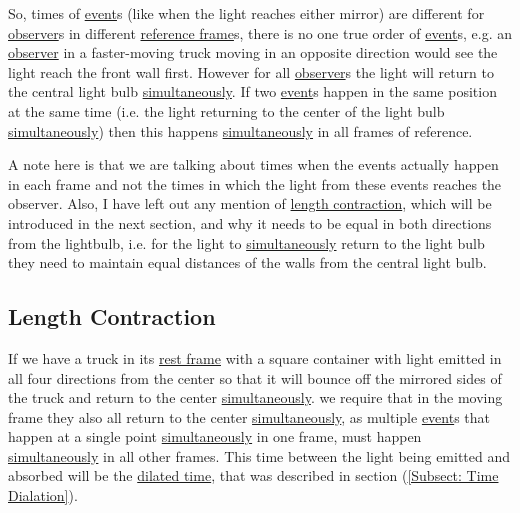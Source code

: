 So, times of \hyperlink{def-event}{event}s (like when the light reaches either mirror) are different for \hyperlink{def-observer}{observer}s in different \hyperlink{def-Reference-frame}{reference frame}s, there is no one true order of \hyperlink{def-event}{event}s, e.g. an \hyperlink{def-observer}{observer} in a faster-moving truck moving in an opposite direction would see the light reach the front wall first.
However for all \hyperlink{def-observer}{observer}s the light will return to the central light bulb \hyperlink{def-simultaneity}{simultaneously}. If two \hyperlink{def-event}{event}s happen in the same position at the same time (i.e. the light returning to the center of the light bulb \hyperlink{def-simultaneity}{simultaneously}) then this happens \hyperlink{def-simultaneity}{simultaneously} in all frames of reference.

A note here is that we are talking about times when the events actually happen in each frame and not the times in which the light from these events reaches the observer. Also, I have left out any mention of \hyperlink{def-length-contraction}{length contraction}, which will be introduced in the next section, and why it needs to be equal in both directions from the lightbulb, i.e. for the light to \hyperlink{def-simultaneity}{simultaneously} return to the light bulb they need to maintain equal distances of the walls from the central light bulb.

\subsection{Length Contraction}\label{sect: Length Contraction}

If we have a truck in its \hyperlink{def-proper-frame}{rest frame} with a square container with light emitted in all four directions from the center so that it will bounce off the mirrored sides of the truck and return to the center \hyperlink{def-simultaneity}{simultaneously}. we require that in the moving frame they also all return to the center \hyperlink{def-simultaneity}{simultaneously}, as multiple \hyperlink{def-event}{event}s that happen at a single point \hyperlink{def-simultaneity}{simultaneously} in one frame, must happen \hyperlink{def-simultaneity}{simultaneously} in all other frames. This time between the light being emitted and absorbed will be the \hyperlink{def-time-dilation}{dilated time}, that was described in section (\ref{Subsect: Time Dialation}).

